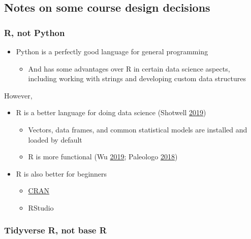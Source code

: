 \documentclass[
]{article}
\providecommand{\tightlist}{%
  \setlength{\itemsep}{0pt}\setlength{\parskip}{0pt}}
\begin{document}
\hypertarget{notes-on-some-course-design-decisions}{%
\subsection{Notes on some course design decisions}\label{notes-on-some-course-design-decisions}}

\hypertarget{r-not-python}{%
\subsubsection{R, not Python}\label{r-not-python}}

\begin{itemize}
\tightlist
\item
  Python is a perfectly good language for general programming

  \begin{itemize}
  \tightlist
  \item
    And has some advantages over R in certain data science aspects, including working with strings and developing custom data structures
  \end{itemize}
\end{itemize}

However,

\begin{itemize}
\tightlist
\item
  R is a better language for doing data science (Shotwell \protect\hyperlink{ref-ShotwellWhyUse2019}{2019})

  \begin{itemize}
  \tightlist
  \item
    Vectors, data frames, and common statistical models are installed and loaded by default
  \item
    R is more functional (Wu \protect\hyperlink{ref-WuPythonVsChoosing2019}{2019}; Paleologo \protect\hyperlink{ref-PaleologoWhatDifferenceMachine2018}{2018})
  \end{itemize}
\item
  R is also better for beginners

  \begin{itemize}
  \tightlist
  \item
    \href{https://twitter.com/kccarrell/status/1030482372775620613}{CRAN}
  \item
    RStudio
  \end{itemize}
\end{itemize}

\hypertarget{tidyverse-r-not-base-r}{%
\subsubsection{Tidyverse R, not base R}\label{tidyverse-r-not-base-r}}
\end{document}
